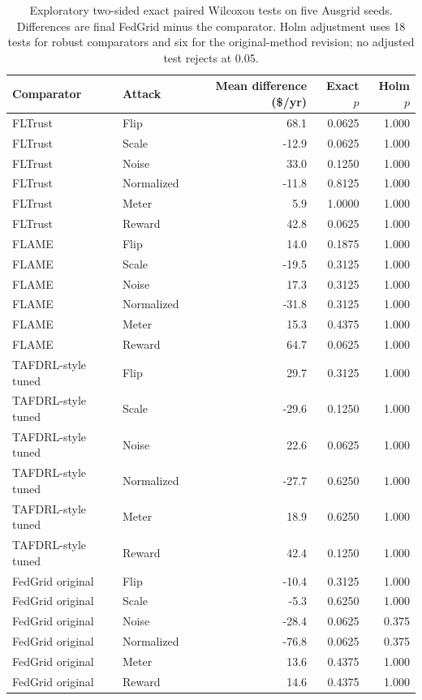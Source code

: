 \begin{table}[htbp]
\centering\small
\caption{Exploratory two-sided exact paired Wilcoxon tests on five Ausgrid seeds. Differences are final FedGrid minus the comparator. Holm adjustment uses 18 tests for robust comparators and six for the original-method revision; no adjusted test rejects at 0.05.}
\label{tab:exact_statistics}
\begin{tabular}{llrrr}
\toprule
Comparator & Attack & Mean difference (\$/yr) & Exact $p$ & Holm $p$ \\
\midrule
FLTrust & Flip & 68.1 & 0.0625 & 1.000 \\
FLTrust & Scale & -12.9 & 0.0625 & 1.000 \\
FLTrust & Noise & 33.0 & 0.1250 & 1.000 \\
FLTrust & Normalized & -11.8 & 0.8125 & 1.000 \\
FLTrust & Meter & 5.9 & 1.0000 & 1.000 \\
FLTrust & Reward & 42.8 & 0.0625 & 1.000 \\
FLAME & Flip & 14.0 & 0.1875 & 1.000 \\
FLAME & Scale & -19.5 & 0.3125 & 1.000 \\
FLAME & Noise & 17.3 & 0.3125 & 1.000 \\
FLAME & Normalized & -31.8 & 0.3125 & 1.000 \\
FLAME & Meter & 15.3 & 0.4375 & 1.000 \\
FLAME & Reward & 64.7 & 0.0625 & 1.000 \\
TAFDRL-style tuned & Flip & 29.7 & 0.3125 & 1.000 \\
TAFDRL-style tuned & Scale & -29.6 & 0.1250 & 1.000 \\
TAFDRL-style tuned & Noise & 22.6 & 0.0625 & 1.000 \\
TAFDRL-style tuned & Normalized & -27.7 & 0.6250 & 1.000 \\
TAFDRL-style tuned & Meter & 18.9 & 0.6250 & 1.000 \\
TAFDRL-style tuned & Reward & 42.4 & 0.1250 & 1.000 \\
FedGrid original & Flip & -10.4 & 0.3125 & 1.000 \\
FedGrid original & Scale & -5.3 & 0.6250 & 1.000 \\
FedGrid original & Noise & -28.4 & 0.0625 & 0.375 \\
FedGrid original & Normalized & -76.8 & 0.0625 & 0.375 \\
FedGrid original & Meter & 13.6 & 0.4375 & 1.000 \\
FedGrid original & Reward & 14.6 & 0.4375 & 1.000 \\
\bottomrule
\end{tabular}
\end{table}
